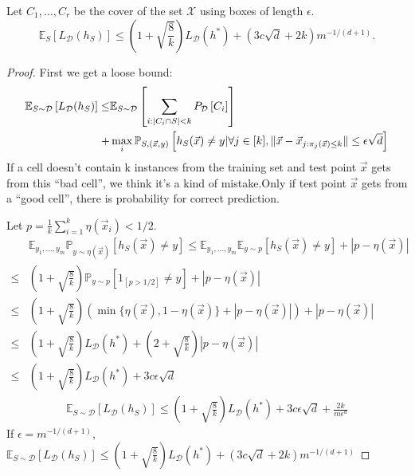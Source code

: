 \begin{theorem}
    Let $ C_1, \ldots, C_r $ be the cover of the set $ \mathcal{X} $ using boxes of length $ \epsilon $.
    \[
        \mathbb{E}_S \left[ L_\mathcal{D} (h_S) \right] \le \left( 1 + \sqrt{\frac{8}{k} } \right) L_{\mathcal{D}}(h^*) + (3c \sqrt{d} + 2k) m ^{-1/(d+1)}.
    \]
    \begin{proof}
        First we get a loose bound:
        \begin{align*}
            \mathbb{E}_{S\sim\mathcal{D}} \left[ L_{\mathcal{D}}(h_S) \right]
            \le& \mathbb{E}_{S\sim\mathcal{D}} \left[ \sum^{}_{i: \left| C_i \cap S \right| < k} P_{\mathcal{D}} \left[ C_i \right] \right] \\
            +& \max_{i} \mathbb{P}_{S, (\vec{x}, y)} \left[ h_{S}(\vec{x}) \ne y | \forall j \in [k], \Arrowvert \vec{x} - \vec{x}_{j: \pi_j(\vec{x}) \le k} \Arrowvert \le \epsilon \sqrt{d} \right]
        \end{align*}
        If a cell doesn't contain k instances from the training set and test point $ \vec{x} $ gets from this ``bad cell'', we think it's a kind of mistake.Only if test point $ \vec{x} $ gets from a ``good cell'', there is probability for correct prediction.

        Let $ p = \frac{1}{k} \sum^{k}_{i=1} \eta(\vec{x}_i) < 1/2 $.
        \begin{align*}
            &\mathbb{E}_{y_1,\ldots, y_m} \mathbb{P}_{y \sim \eta(\vec{x})} \left[ h_S(\vec{x}) \ne y \right]
            \le \mathbb{E}_{y_1, \ldots, y_m} \mathbb{E}_{y \sim p} \left[ h_S(\vec{x}) \ne y \right] + \left| p - \eta(\vec{x}) \right|\\
            \le& \left( 1 + \sqrt{\frac{8}{k}} \right) \mathbb{P}_{y \sim p}\left[ 1_{\left[ p > 1/2 \right]} \ne y\right]+ \left| p - \eta(\vec{x}) \right|\\
            \le& \left( 1 + \sqrt{\frac{8}{k}} \right) \left( \min\{\eta(\vec{x}), 1-\eta(\vec{x})\} + \left| p - \eta(\vec{x}) \right| \right)+ \left| p - \eta(\vec{x}) \right|\\
            \le& \left( 1 + \sqrt{\frac{8}{k} } \right) L_{\mathcal{D}}(h^*) + \left( 2 + \sqrt{\frac{8}{k} } \right) \left| p - \eta(\vec{x}) \right|\\
            \le& \left( 1 + \sqrt{\frac{8}{k} } \right) L_{\mathcal{D}}(h^*) + 3c \epsilon \sqrt{d}
        \end{align*}
        \begin{align*}
            \mathbb{E}_{S \sim \mathcal{D}}\left[ L_{\mathcal{D}} \left( h_S \right) \right]
            \le \left( 1 + \sqrt{\frac{8}{k} } \right) L_{\mathcal{D}}(h^*) + 3c \epsilon \sqrt{d} + \frac{2k}{m \epsilon^d} 
        \end{align*}
        If $ \epsilon = m ^{-1/(d+1)} $, $ \mathbb{E}_{S \sim \mathcal{D}} \left[ L_{\mathcal{D}} (h_S) \right] \le \left( 1 + \sqrt{\frac{8}{k} } \right) L_{\mathcal{D}}(h^*) + (3c \sqrt{d} + 2k) m ^{-1/(d+1)}$
    \end{proof}
\end{theorem}

